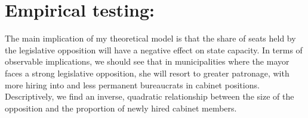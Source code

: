 \documentclass[12pt,]{book}
\newenvironment{Shaded}{\begin{snugshade}}{\end{snugshade}}
\newcommand{\CommentTok}[1]{\textcolor[rgb]{0.56,0.35,0.01}{\textit{#1}}}
\newcommand{\DataTypeTok}[1]{\textcolor[rgb]{0.13,0.29,0.53}{#1}}
\newcommand{\DecValTok}[1]{\textcolor[rgb]{0.00,0.00,0.81}{#1}}
\newcommand{\FloatTok}[1]{\textcolor[rgb]{0.00,0.00,0.81}{#1}}
\newcommand{\KeywordTok}[1]{\textcolor[rgb]{0.13,0.29,0.53}{\textbf{#1}}}
\newcommand{\NormalTok}[1]{#1}
\newcommand{\OperatorTok}[1]{\textcolor[rgb]{0.81,0.36,0.00}{\textbf{#1}}}
\newcommand{\StringTok}[1]{\textcolor[rgb]{0.31,0.60,0.02}{#1}}
\begin{document}
\hypertarget{empirical-testing}{%
\section{Empirical testing:}\label{empirical-testing}}

The main implication of my theoretical model is that the share of seats held by the legislative opposition will have a negative effect on state capacity. In terms of observable implications, we should see that in municipalities where the mayor faces a strong legislative opposition, she will resort to greater patronage, with more hiring into and less permanent bureaucrats in cabinet positions. Descriptively, we find an inverse, quadratic relationship between the size of the opposition and the proportion of newly hired cabinet members.

\begin{Shaded}
\end{Shaded}
\end{document}
